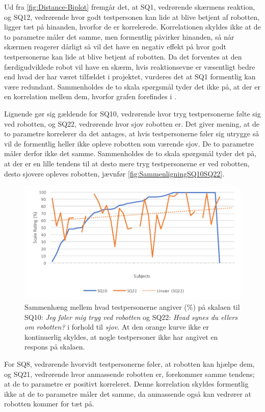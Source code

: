 Ud fra \autoref{fig:Distance-Biplot} fremgår det, at SQ1, vedrørende skærmens reaktion, og SQ12, vedrørende hvor godt testpersonen kan lide at blive betjent af robotten, ligger tæt på hinanden, hvorfor de er korrelerede. Korrelationen skyldes ikke at de to parametre måler det samme, men formentlig påvirker hinanden, så når skærmen reagerer dårligt så vil det have en negativ effekt på hvor godt testpersonerne kan lide at blive betjent af robotten. Da det forventes at den færdigudviklede robot vil have en skærm, hvis reaktionsevne er væsentligt bedre end hvad der har været tilfældet i projektet, vurderes det at SQ1 formentlig kan være redundant. Sammenholdes de to skala spørgsmål tyder det ikke på, at der er en korrelation mellem dem, hvorfor grafen forefindes i .

Lignende gør sig gældende for SQ10, vedrørende hvor tryg testpersonerne følte sig ved robotten, og SQ22, vedrørende hvor sjov robotten er. Det giver mening, at de to parametre korrelerer da det antages, at hvis testpersonerne føler sig utrygge så vil de formentlig heller ikke opleve robotten som værende sjov. De to parametre måler derfor ikke det samme. Sammenholdes de to skala spørgsmål tyder det på, at der er en lille tendens til at desto mere tryg testpersonerne er ved robotten, desto sjovere opleves robotten, jævnfør \autoref{fig:SammenligningSQ10SQ22}. 
%
\begin{figure}[H]
	\centering
	\includegraphics[width=\textwidth]{Figure/Korrelationsgrafer/SQ10+SQ22}
	\caption{Sammenhæng mellem hvad testpersonerne angiver (\%) på skalaen til SQ10: \textit{Jeg føler mig tryg ved robotten} og SQ22: \textit{Hvad synes du ellers om robotten?} i forhold til \textit{sjov}. At den orange kurve ikke er kontinuerlig skyldes, at nogle testpersoner ikke har angivet en respons på skalaen.}
	\label{fig:SammenligningSQ10SQ22}
\end{figure}
\noindent
%
For SQ8, vedrørende hvorvidt testpersonerne føler, at robotten kan hjælpe dem, og SQ21, vedrørende hvor anmassende robotten er, forekommer samme tendens; at de to parametre er positivt korreleret. Denne korrelation skyldes formentlig ikke at de to parametre måler det samme, da anmassende også kan vedrører at robotten kommer for tæt på. 


